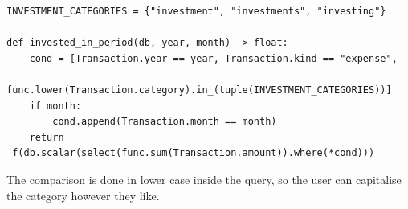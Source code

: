 \begin{lstlisting}[style=py]
INVESTMENT_CATEGORIES = {"investment", "investments", "investing"}

def invested_in_period(db, year, month) -> float:
    cond = [Transaction.year == year, Transaction.kind == "expense",
            func.lower(Transaction.category).in_(tuple(INVESTMENT_CATEGORIES))]
    if month:
        cond.append(Transaction.month == month)
    return _f(db.scalar(select(func.sum(Transaction.amount)).where(*cond)))
\end{lstlisting}

The comparison is done in lower case inside the query, so the user can capitalise
the category however they like.
